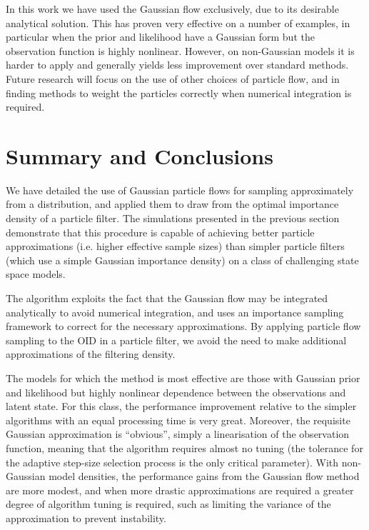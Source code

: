 \documentclass[12pt]{article}
\begin{document}
In this work we have used the Gaussian flow exclusively, due to its desirable analytical solution. This has proven very effective on a number of examples, in particular when the prior and likelihood have a Gaussian form but the observation function is highly nonlinear. However, on non-Gaussian models it is harder to apply and generally yields less improvement over standard methods. Future research will focus on the use of other choices of particle flow, and in finding methods to weight the particles correctly when numerical integration is required.




\section{Summary and Conclusions}

We have detailed the use of Gaussian particle flows for sampling approximately from a distribution, and applied them to draw from the optimal importance density of a particle filter. The simulations presented in the previous section demonstrate that this procedure is capable of achieving better particle approximations (i.e. higher effective sample sizes) than simpler particle filters (which use a simple Gaussian importance density) on a class of challenging state space models.

The algorithm exploits the fact that the Gaussian flow may be integrated analytically to avoid numerical integration, and uses an importance sampling framework to correct for the necessary approximations. By applying particle flow sampling to the OID in a particle filter, we avoid the need to make additional approximations of the filtering density.

The models for which the method is most effective are those with Gaussian prior and likelihood but highly nonlinear dependence between the observations and latent state. For this class, the performance improvement relative to the simpler algorithms with an equal processing time is very great. Moreover, the requisite Gaussian approximation is ``obvious'', simply a linearisation of the observation function, meaning that the algorithm requires almost no tuning (the tolerance for the adaptive step-size selection process is the only critical parameter). With non-Gaussian model densities, the performance gains from the Gaussian flow method are more modest, and when more drastic approximations are required a greater degree of algorithm tuning is required, such as limiting the variance of the approximation to prevent instability.


\singlespacing


%
\end{document}
